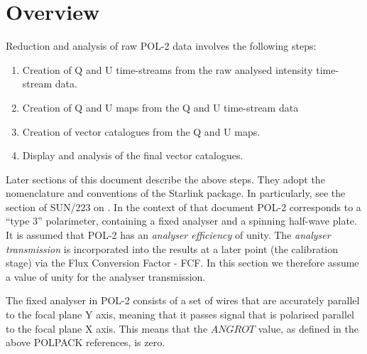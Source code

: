 \documentclass[twoside,11pt]{starlink}
\begin{document}
\scfrontmatter
\section{Overview}

Reduction and analysis of raw POL-2 data involves the following steps:

\begin{enumerate}
\item Creation of  Q and U time-streams from the raw analysed intensity time-stream data.
\item Creation of Q and U maps from the Q and U time-stream data
\item Creation of vector catalogues from the Q and U maps.
\item Display and analysis of the final vector catalogues.
\end{enumerate}

Later sections of this document describe the above steps. They adopt the
nomenclature and conventions of the Starlink 
package. In particularly, see the section of SUN/223 on . In the context of that
document POL-2 corresponds to a ``type 3'' polarimeter, containing a
fixed analyser and a spinning half-wave plate. It is assumed that POL-2
has an \emph{analyser efficiency} of unity. The \emph{analyser
transmission} is incorporated into the results at a later point (the
calibration stage) via the Flux Conversion Factor - FCF. In this section
we therefore assume a value of unity for the analyser transmission.

The fixed analyser in POL-2 consists of a set of wires that are
accurately parallel to the focal plane Y axis, meaning that it passes
signal that is polarised parallel to the focal plane X axis. This means
that the $ANGROT$ value, as defined in the above POLPACK references,
is zero.
\end{document}
